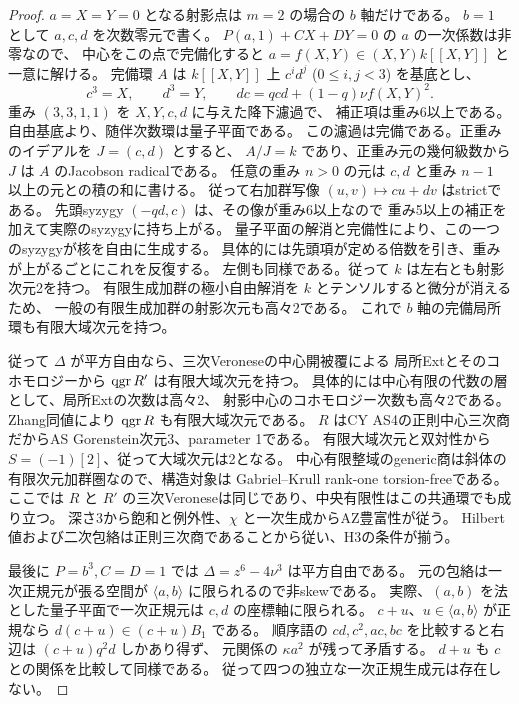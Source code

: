 \begin{proof}
$a=X=Y=0$ となる射影点は $m=2$ の場合の $b$ 軸だけである。
$b=1$ として $a,c,d$ を次数零元で書く。
$P(a,1)+CX+DY=0$ の $a$ の一次係数は非零なので、
中心をこの点で完備化すると $a=f(X,Y)\in(X,Y)k[[X,Y]]$ と一意に解ける。
完備環 $A$ は $k[[X,Y]]$ 上 $c^i d^j$ ($0\le i,j<3$) を基底とし、
\[
 c^3=X,\qquad d^3=Y,\qquad
 dc=qcd+(1-q)\nu f(X,Y)^2 .
\]
重み $(3,3,1,1)$ を $X,Y,c,d$ に与えた降下濾過で、
補正項は重み6以上である。
自由基底より、随伴次数環は量子平面である。
この濾過は完備である。正重みのイデアルを $J=(c,d)$ とすると、
$A/J=k$ であり、正重み元の幾何級数から $J$ は $A$ のJacobson radicalである。
任意の重み $n>0$ の元は $c,d$ と重み $n-1$ 以上の元との積の和に書ける。
従って右加群写像 $(u,v)\mapsto cu+dv$ はstrictである。
先頭syzygy $(-qd,c)$ は、その像が重み6以上なので
重み5以上の補正を加えて実際のsyzygyに持ち上がる。
量子平面の解消と完備性により、この一つのsyzygyが核を自由に生成する。
具体的には先頭項が定める倍数を引き、重みが上がるごとにこれを反復する。
左側も同様である。従って $k$ は左右とも射影次元2を持つ。
有限生成加群の極小自由解消を $k$ とテンソルすると微分が消えるため、
一般の有限生成加群の射影次元も高々2である。
これで $b$ 軸の完備局所環も有限大域次元を持つ。

従って $\Delta$ が平方自由なら、三次Veroneseの中心開被覆による
局所Extとそのコホモロジーから $\operatorname{qgr} R'$ は有限大域次元を持つ。
具体的には中心有限の代数の層として、局所Extの次数は高々2、
射影中心のコホモロジー次数も高々2である。
Zhang同値により $\operatorname{qgr} R$ も有限大域次元である。
$R$ はCY AS4の正則中心三次商だからAS Gorenstein次元3、parameter 1である。
有限大域次元と双対性から $S=(-1)[2]$、従って大域次元は2となる。
中心有限整域のgeneric商は斜体の有限次元加群圏なので、構造対象は
Gabriel--Krull rank-one torsion-freeである。
ここでは $R$ と $R'$ の三次Veroneseは同じであり、中央有限性はこの共通環でも成り立つ。
深さ3から飽和と例外性、$\chi$ と一次生成からAZ豊富性が従う。
Hilbert値および二次包絡は正則三次商であることから従い、H3の条件が揃う。

最後に $P=b^3,C=D=1$ では $\Delta=z^6-4\nu^3$ は平方自由である。
元の包絡は一次正規元が張る空間が $\langle a,b\rangle$ に限られるので非skewである。
実際、$(a,b)$ を法とした量子平面で一次正規元は $c,d$ の座標軸に限られる。
$c+u$、$u\in\langle a,b\rangle$ が正規なら $d(c+u)\in(c+u)B_1$ である。
順序語の $cd,c^2,ac,bc$ を比較すると右辺は $(c+u)q^2d$ しかあり得ず、
元関係の $\kappa a^2$ が残って矛盾する。
$d+u$ も $c$ との関係を比較して同様である。
従って四つの独立な一次正規生成元は存在しない。
\end{proof}

